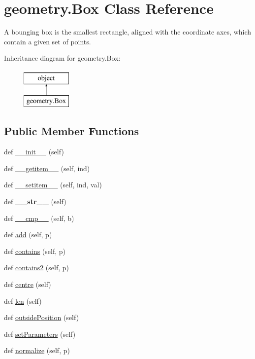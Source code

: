 \hypertarget{classgeometry_1_1Box}{}\section{geometry.\+Box Class Reference}
\label{classgeometry_1_1Box}


A bounging box is the smallest rectangle, aligned with the coordinate axes, which contain a given set of points.  


Inheritance diagram for geometry.\+Box\+:\begin{figure}[H]
\begin{center}
\leavevmode
\includegraphics[height=2.000000cm]{classgeometry_1_1Box}
\end{center}
\end{figure}
\subsection*{Public Member Functions}
\begin{DoxyCompactItemize}
\item 
def \hyperlink{classgeometry_1_1Box_acd3c4e947c8bc7e6fe8efe8a05842238}{\+\_\+\+\_\+init\+\_\+\+\_\+} (self)
\item 
def \hyperlink{classgeometry_1_1Box_a9fed11ac430eeb493f1f9101ed50e570}{\+\_\+\+\_\+getitem\+\_\+\+\_\+} (self, ind)
\item 
def \hyperlink{classgeometry_1_1Box_afa830f6acc2fe66f4e9fb8a27921570f}{\+\_\+\+\_\+setitem\+\_\+\+\_\+} (self, ind, val)
\item 
\mbox{\label{classgeometry_1_1Box_a8a830538d3a7a8e9022e55d3135d55a4}} 
def {\bfseries \+\_\+\+\_\+str\+\_\+\+\_\+} (self)
\item 
def \hyperlink{classgeometry_1_1Box_ad6bd218082264a42a11c0d36ff3f8ff1}{\+\_\+\+\_\+cmp\+\_\+\+\_\+} (self, b)
\item 
def \hyperlink{classgeometry_1_1Box_a4b0f4675b22c67b531b00459cf6858b5}{add} (self, p)
\item 
def \hyperlink{classgeometry_1_1Box_af184892d7008637d2d34a9cc4fa4fdd5}{contains} (self, p)
\item 
def \hyperlink{classgeometry_1_1Box_af22304a33ca2c58b7ca21427608602e0}{contains2} (self, p)
\item 
def \hyperlink{classgeometry_1_1Box_aaab7456e78cc5b951e1b832b6816d332}{centre} (self)
\item 
def \hyperlink{classgeometry_1_1Box_af876b4d7ab7286682103a064e96f43d6}{len} (self)
\item 
def \hyperlink{classgeometry_1_1Box_a6bd75c486ba4bb587c3003484be1bc6d}{outside\+Position} (self)
\item 
def \hyperlink{classgeometry_1_1Box_a2af13fbaf9c38d904e05d73e35b5f9f9}{set\+Parameters} (self)
\item 
def \hyperlink{classgeometry_1_1Box_af671baed782da60af8058570b2f6bfa9}{normalize} (self, p)
\end{DoxyCompactItemize}
